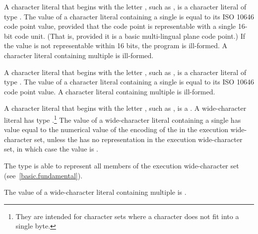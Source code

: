 \pnum
{}%
%
%
A character literal that
begins with the letter , such as ,
%
is a character literal of type . The value
of a  character literal containing a single  is
equal to its ISO 10646 code point value, provided that the code point is
representable with a single 16-bit code unit. (That is, provided it is a
basic multi-lingual plane code point.) If the value is not representable
within 16 bits, the program is ill-formed. A  character literal
containing multiple  is ill-formed.

\pnum
{}%
%
%
A character literal that
begins with the letter , such as ,
%
is a character literal of type . The value of a
 character literal containing a single  is equal
to its ISO 10646 code point value. A  character literal containing
multiple  is ill-formed.

\pnum
{}%
%
%
%
A character literal that
begins with the letter , such as ,
%
is a . A wide-character literal has type
.\footnote{They are intended for character sets where a character does
not fit into a single byte. }
The value of a wide-character literal containing a single
 has value equal to the numerical value of the encoding
of the  in the execution wide-character set, unless the
 has no representation in the execution wide-character set, in which
case the value is . \begin{note} The type  is able to
represent all members of the execution wide-character set (see~\ref{basic.fundamental}).
\end{note} The value
of a wide-character literal containing multiple  is
.

